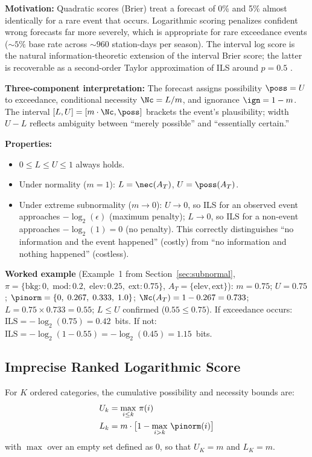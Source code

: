 \textbf{Motivation:} Quadratic scores (Brier) treat a forecast of 0\% and 5\% almost identically for a rare event that occurs. Logarithmic scoring penalizes confident wrong forecasts far more severely, which is appropriate for rare exceedance events (${\sim}5\%$ base rate across ${\sim}960$ station-days per season). The interval log score is the natural information-theoretic extension of the interval Brier score; the latter is recoverable as a second-order Taylor approximation of ILS around $p = 0.5$ \citep{Roulston2002-eq}.

\textbf{Three-component interpretation:} The forecast assigns possibility $\poss = U$ to exceedance, conditional necessity $\Nc = L/m$, and ignorance $\ign = 1 - m$. The interval $[L, U] = [m \cdot \Nc, \poss]$ brackets the event's plausibility; width $U - L$ reflects ambiguity between ``merely possible'' and ``essentially certain.''

\textbf{Properties:}
\begin{itemize}[leftmargin=2em]
\item $0 \leq L \leq U \leq 1$ always holds.
\item Under normality ($m = 1$): $L = \nec(A_T)$, $U = \poss(A_T)$.
\item Under extreme subnormality ($m \to 0$): $U \to 0$, so ILS for an observed event approaches $-\log_2(\epsilon)$ (maximum penalty); $L \to 0$, so ILS for a non-event approaches $-\log_2(1) = 0$ (no penalty). This correctly distinguishes ``no information and the event happened'' (costly) from ``no information and nothing happened'' (costless).
\end{itemize}

\textbf{Worked example} (Example~1 from Section~\ref{sec:subnormal}, $\pi = \{\text{bkg}: 0,\;\text{mod}: 0.2,\;\text{elev}: 0.25,\;\text{ext}: 0.75\}$, $A_T = \{\text{elev}, \text{ext}\}$):\; $m = 0.75$;\; $U = 0.75$;\; $\pinorm = \{0,\; 0.267,\; 0.333,\; 1.0\}$;\; $\Nc(A_T) = 1 - 0.267 = 0.733$;\; $L = 0.75 \times 0.733 = 0.55$;\; $L \leq U$ confirmed ($0.55 \leq 0.75$).\; If exceedance occurs: $\mathrm{ILS} = -\log_2(0.75) = 0.42$~bits.\; If not: $\mathrm{ILS} = -\log_2(1 - 0.55) = -\log_2(0.45) = 1.15$~bits.

\subsection{Imprecise Ranked Logarithmic Score}\label{sec:irls}

For $K$ ordered categories, the cumulative possibility and necessity bounds are:
\begin{align}
U_k &= \max_{i \leq k}\, \pi(i) \\
L_k &= m \cdot \bigl[1 - \max_{i > k}\, \pinorm(i)\bigr]
\end{align}
with $\max$ over an empty set defined as $0$, so that $U_K = m$ and $L_K = m$.

